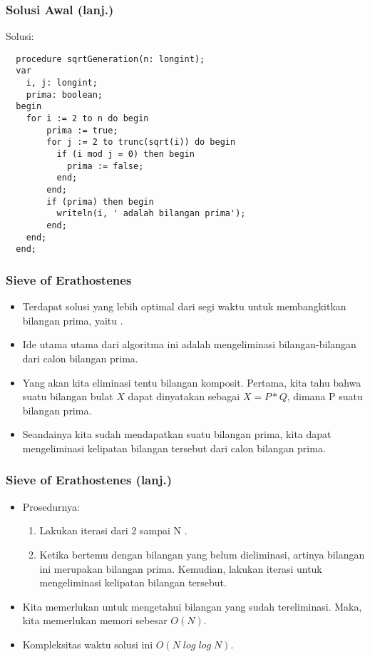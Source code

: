 \begin{frame}[fragile]
\frametitle{Solusi Awal (lanj.)}
Solusi:
  \begin{lstlisting}
  procedure sqrtGeneration(n: longint);
  var
    i, j: longint;
    prima: boolean;
  begin
    for i := 2 to n do begin
        prima := true;
        for j := 2 to trunc(sqrt(i)) do begin
          if (i mod j = 0) then begin
            prima := false;
          end;  
        end;
        if (prima) then begin
          writeln(i, ' adalah bilangan prima');
        end;
    end;
  end;  
  \end{lstlisting}
\end{frame}

\begin{frame}
\frametitle{Sieve of Erathostenes}
\begin{itemize}
  \item Terdapat solusi yang lebih optimal dari segi waktu untuk membangkitkan bilangan prima, yaitu .
  \item Ide utama utama dari algoritma ini adalah mengeliminasi bilangan-bilangan dari calon bilangan prima.
  \item Yang akan kita eliminasi tentu bilangan komposit. Pertama, kita tahu bahwa suatu bilangan bulat $X$ dapat dinyatakan sebagai $X = P*Q$, dimana P suatu bilangan prima.
  \item Seandainya kita sudah mendapatkan suatu bilangan prima, kita dapat mengeliminasi kelipatan bilangan tersebut dari calon bilangan prima.
\end{itemize}
\end{frame}

\begin{frame}
\frametitle{Sieve of Erathostenes (lanj.)}
\begin{itemize}
  \item Prosedurnya:
  \begin{enumerate}
    \item Lakukan iterasi dari 2 sampai N .
    \item Ketika bertemu dengan bilangan yang belum dieliminasi, artinya bilangan ini merupakan bilangan prima. Kemudian, lakukan iterasi untuk mengeliminasi kelipatan bilangan tersebut.
  \end{enumerate}
  \item Kita memerlukan  untuk mengetahui bilangan yang sudah tereliminasi. Maka, kita memerlukan memori sebesar $O(N)$.
  \item Kompleksitas waktu solusi ini $O(N\;log\;log\;N)$.
\end{itemize}
\end{frame}


